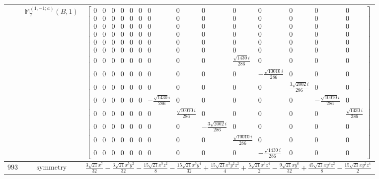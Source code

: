 \documentclass[fleqn,8pt,landscape]{jsarticle}
\begin{document}
\begin{longtable}{ccc}
$  $ & $ \mathbb{M}_{7}^{(1,-1;a)}(B,1) $ & $ \begin{bmatrix} 0 & 0 & 0 & 0 & 0 & 0 & 0 & 0 & 0 & 0 & 0 & 0 & 0 & 0 \\ 0 & 0 & 0 & 0 & 0 & 0 & 0 & 0 & 0 & 0 & 0 & 0 & 0 & 0 \\ 0 & 0 & 0 & 0 & 0 & 0 & 0 & 0 & 0 & 0 & 0 & 0 & 0 & 0 \\ 0 & 0 & 0 & 0 & 0 & 0 & 0 & 0 & 0 & 0 & 0 & 0 & 0 & 0 \\ 0 & 0 & 0 & 0 & 0 & 0 & 0 & 0 & 0 & 0 & 0 & 0 & 0 & 0 \\ 0 & 0 & 0 & 0 & 0 & 0 & 0 & 0 & 0 & 0 & 0 & 0 & 0 & 0 \\ 0 & 0 & 0 & 0 & 0 & 0 & 0 & 0 & 0 & \frac{\sqrt{1430} i}{286} & 0 & 0 & 0 & 0 \\ 0 & 0 & 0 & 0 & 0 & 0 & 0 & 0 & 0 & 0 & - \frac{\sqrt{10010} i}{286} & 0 & 0 & 0 \\ 0 & 0 & 0 & 0 & 0 & 0 & 0 & 0 & 0 & 0 & 0 & \frac{3 \sqrt{2002} i}{286} & 0 & 0 \\ 0 & 0 & 0 & 0 & 0 & 0 & - \frac{\sqrt{1430} i}{286} & 0 & 0 & 0 & 0 & 0 & - \frac{\sqrt{10010} i}{286} & 0 \\ 0 & 0 & 0 & 0 & 0 & 0 & 0 & \frac{\sqrt{10010} i}{286} & 0 & 0 & 0 & 0 & 0 & \frac{\sqrt{1430} i}{286} \\ 0 & 0 & 0 & 0 & 0 & 0 & 0 & 0 & - \frac{3 \sqrt{2002} i}{286} & 0 & 0 & 0 & 0 & 0 \\ 0 & 0 & 0 & 0 & 0 & 0 & 0 & 0 & 0 & \frac{\sqrt{10010} i}{286} & 0 & 0 & 0 & 0 \\ 0 & 0 & 0 & 0 & 0 & 0 & 0 & 0 & 0 & 0 & - \frac{\sqrt{1430} i}{286} & 0 & 0 & 0 \end{bmatrix} $ \\ \hline
$ 993 $ & $ \text{symmetry} $ & $ \frac{3 \sqrt{21} x^{7}}{32} - \frac{3 \sqrt{21} x^{5} y^{2}}{32} - \frac{15 \sqrt{21} x^{5} z^{2}}{8} - \frac{15 \sqrt{21} x^{3} y^{4}}{32} + \frac{15 \sqrt{21} x^{3} y^{2} z^{2}}{4} + \frac{5 \sqrt{21} x^{3} z^{4}}{2} - \frac{9 \sqrt{21} x y^{6}}{32} + \frac{45 \sqrt{21} x y^{4} z^{2}}{8} - \frac{15 \sqrt{21} x y^{2} z^{4}}{2} $ \\

\end{longtable}
\end{document}
